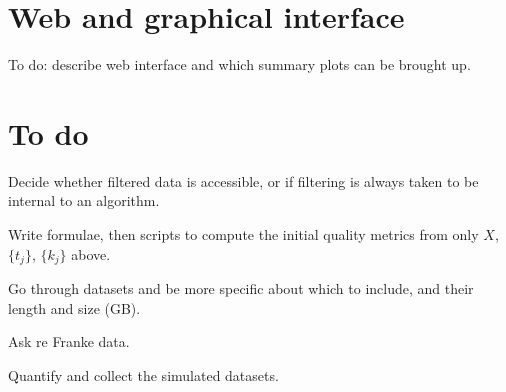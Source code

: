 \documentclass[10pt]{article}
\begin{document}
\section{Web and graphical interface}

To do: describe web interface and which summary plots can be brought up.


\section{To do}

Decide whether filtered data is accessible, or if filtering is always
taken to be internal to an algorithm.

Write formulae, then scripts to compute the initial quality metrics from only
$X$, $\{t_j\}$, $\{k_j\}$ above.

Go through datasets and be more specific about which to include, and their
length and size (GB).

Ask re Franke data.

Quantify and collect the simulated datasets.




\end{document}
